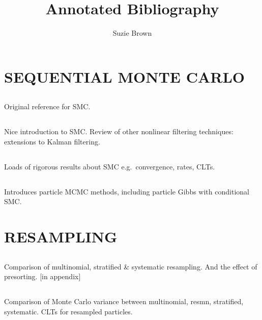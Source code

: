\documentclass{article}
\title{Annotated Bibliography}
\author{Suzie Brown}
\date{}
\begin{document}
\maketitle

%
\section*{SEQUENTIAL MONTE CARLO}

\subsection*{\cite{gordon1993}}
Original reference for SMC.

\subsection*{\cite{kitagawa1996}}
Nice introduction to SMC. Review of other nonlinear filtering techniques: extensions to Kalman filtering.

\subsection*{\cite{delmoral2013}}
Loads of rigorous results about SMC e.g.\ convergence, rates, CLTs.

\subsection*{\cite{doucet2009}}


\subsection*{\cite{andrieu2010}}
Introduces particle MCMC methods, including particle Gibbs with conditional SMC.

%
\section*{RESAMPLING}

\subsection*{\cite{kitagawa1996}}
Comparison of multinomial, stratified \& systematic resampling. And the effect of presorting. [in appendix]

\subsection*{\cite{douc2005}}
Comparison of Monte Carlo variance between multinomial, resmn, stratified, systematic. CLTs for resampled particles.
\end{document}
